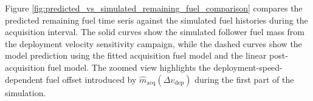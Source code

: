 Figure \ref{fig:predicted_vs_simulated_remaining_fuel_comparison} compares the predicted remaining fuel time seris against the simulated fuel histories during the acquisition interval. The solid curves show the simulated follower fuel mass from the deployment velocity sensitivity campaign, while the dashed curves show the model prediction using the fitted acquisition fuel model and the linear post-acquisition fuel model. The zoomed view highlights the deployment-speed-dependent fuel offset introduced by $\hat{m}_{\mathrm{acq}}(\Delta v_{\mathrm{dep}})$ during the first part of the simulation.

